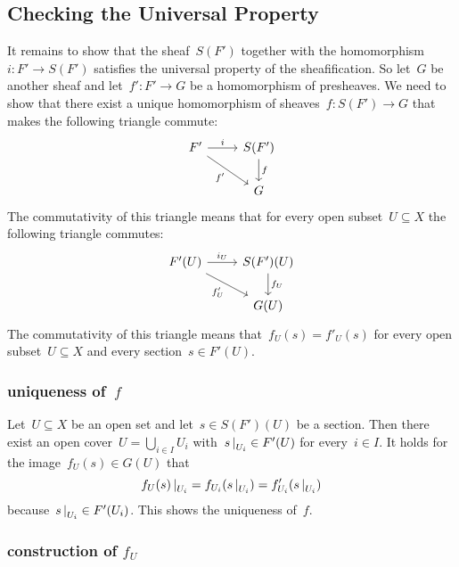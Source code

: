 \subsection*{Checking the Universal Property}

It remains to show that the sheaf~$S(F')$ together with the homomorphism~$i \colon F' \to S(F')$ satisfies the universal property of the sheafification.
So let~$G$ be another sheaf and let~$f' \colon F' \to G$ be a homomorphism of presheaves.
We need to show that there exist a unique homomorphism of sheaves~$f \colon S(F') \to G$ that makes the following triangle commute:
\[
  \begin{tikzcd}
      F'
      \arrow{r}[above]{i}
      \arrow{dr}[below left]{f'}
    & S(F')
      \arrow{d}[right]{f}
    \\
    {}
    & G
  \end{tikzcd}
\]
The commutativity of this triangle means that for every open subset~$U \subseteq X$ the following triangle commutes:
\[
  \begin{tikzcd}
      F'(U)
      \arrow{r}[above]{i_U}
      \arrow{dr}[below left]{f'_U}
    & S(F')(U)
      \arrow{d}[right]{f_U}
    \\
    {}
    & G(U)
  \end{tikzcd}
\]
The commutativity of this triangle means that~$f_U(s) = f'_U(s)$ for every open subset~$U \subseteq X$ and every section~$s \in F'(U)$.





\subsubsection*{uniqueness of~$f$}

Let~$U \subseteq X$ be an open set and let~$s \in S(F')(U)$ be a section.
Then there exist an open cover~$U = \bigcup_{i \in I} U_i$ with~$\restrict{s}{U_i} \in F'(U)$ for every~$i \in I$.
It holds for the image~$f_U(s) \in G(U)$ that
\[
    \restrict{ f_U(s) }{U_i}
  = f_{U_i}( \restrict{s}{U_i} )
  = f'_{U_i}( \restrict{s}{U_i} )
\]
because~$\restrict{s}{U_i} \in F'(U_i)$.
This shows the uniqueness of~$f$.



\subsubsection*{construction of $f_U$}

